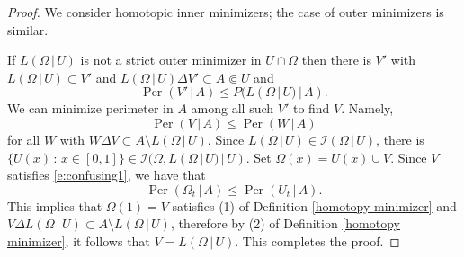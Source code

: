 \documentclass[12pt,twoside]{amsart}
\numberwithin{equation}{section}
\renewcommand{\leq}{\leqslant}
\newcommand{\cI}{\mathcal I}
\DeclareMathOperator{\Per}{Per}
\begin{document}
\begin{proof}
	We consider homotopic inner minimizers; the case of outer minimizers is similar. 
	
	If $L(\Omega\,|\, U)$ is not a strict outer minimizer in $U\cap \Omega$ then there is $V'$ with $L(\Omega\,|\, U)\subset V'$ and $L(\Omega\,|\, U) \Delta V' \subset A \Subset U$ and
	\[
	\Per(V'\,|\,A) \leq P(L(\Omega\,|\, U)\,|\,A).
	\]
	We can minimize perimeter in $A$ among all such $V'$ to find $V$. Namely,
	\begin{equation}\label{e:confusing1}
	\Per( V \,|\,A )\leq \Per(W\,|\,A)  
	\end{equation} 
		for all $W$ with $W\Delta V\subset A\setminus L(\Omega\,|\, U)$. Since $L(\Omega\,|\, U) \in \cI(\Omega\,|\, U)$, there is $\{U(x)\,:\,x \in [0,1]\} \in \cI(\Omega, L(\Omega\,|\,U)\,|\,U)$. Set $\Omega(x) = U(x) \cup V$. Since $V$ satisfies \eqref{e:confusing1},
we have that 
	$$
	\Per(\Omega_t\,|\,A) \leq \Per(U_t\,|\,A).
	$$
	This implies that $\Omega(1)=V$ satisfies (1) of Definition \ref{homotopy minimizer} and $V \Delta L(\Omega\,|\,U)\subset A \setminus L(\Omega\,|\, U)$, therefore by (2) of Definition \ref{homotopy minimizer}, it follows that $V= L(\Omega\,|\,U)$. This completes the proof. 
\end{proof}
\end{document}

